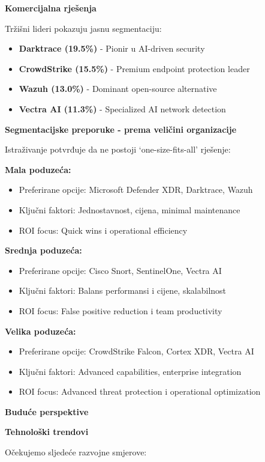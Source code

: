 \textbf{Komercijalna rješenja}

Tržišni lideri pokazuju jasnu segmentaciju:
\begin{itemize}
\item \textbf{Darktrace (19.5\%)} - Pionir u AI-driven security
\item \textbf{CrowdStrike (15.5\%)} - Premium endpoint protection leader
\item \textbf{Wazuh (13.0\%)} - Dominant open-source alternative
\item \textbf{Vectra AI (11.3\%)} - Specialized AI network detection
\end{itemize}

\textbf{Segmentacijske preporuke - prema veličini organizacije}

Istraživanje potvrđuje da ne postoji `one-size-fits-all' rješenje:

\textbf{Mala poduzeća:}
\begin{itemize}
\item Preferirane opcije: Microsoft Defender XDR, Darktrace, Wazuh
\item Ključni faktori: Jednostavnost, cijena, minimal maintenance
\item ROI focus: Quick wins i operational efficiency
\end{itemize}

\textbf{Srednja poduzeća:}
\begin{itemize}
\item Preferirane opcije: Cisco Snort, SentinelOne, Vectra AI
\item Ključni faktori: Balans performansi i cijene, skalabilnost
\item ROI focus: False positive reduction i team productivity
\end{itemize}

\textbf{Velika poduzeća:}
\begin{itemize}
\item Preferirane opcije: CrowdStrike Falcon, Cortex XDR, Vectra AI
\item Ključni faktori: Advanced capabilities, enterprise integration
\item ROI focus: Advanced threat protection i operational optimization
\end{itemize}

\textbf{Buduće perspektive}

\textbf{Tehnološki trendovi}

Očekujemo sljedeće razvojne smjerove:

